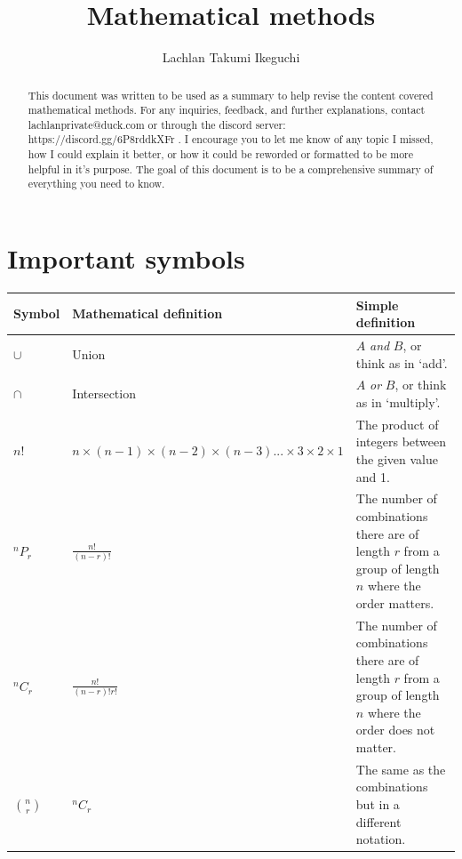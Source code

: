\documentclass{report}
\title{Mathematical methods}
\author{Lachlan Takumi Ikeguchi}
\begin{document}
\maketitle
\tableofcontents

\begin{abstract}
	This document was written to be used as a summary to help revise the content covered mathematical methods.  For any inquiries, feedback, and further explanations, contact lachlanprivate@duck.com or through the discord server: https://discord.gg/6P8rddkXFr .  I encourage you to let me know of any topic I missed, how I could explain it better, or how it could be reworded or formatted to be more helpful in it's purpose.  The goal of this document is to be a comprehensive summary of everything you need to know.
\end{abstract}

\section{Important symbols}
\begin{center}
	\begin{tabular}{l|lp{6cm}}
		Symbol         & Mathematical definition                                                  & Simple definition                                                                                              \\ \hline
		$\cup$         & Union                                                                    & $A$ \emph{and} $B$, or think as in `add'.                                                                      \\
		$\cap$         & Intersection                                                             & $A$ \emph{or} $B$, or think as in `multiply'.                                                                  \\
		$n!$           & $n \times (n-1) \times (n-2) \times (n-3)... \times 3 \times 2 \times 1$ & The product of integers between the given value and 1.                                                         \\
		$^nP_r$        & $\frac{n!}{(n-r)!}$                                                      & The number of combinations there are of length $r$ from a group of length $n$ where the order matters.         \\
		$^nC_r$        & $\frac{n!}{(n-r)!r!}$                                                    & The number of combinations there are of length $r$ from a group of length $n$ where the order does not matter. \\
		$\binom{n}{r}$ & $^nC_r$                                                                  & The same as the combinations but in a different notation.
	\end{tabular}
\end{center}
\end{document}
